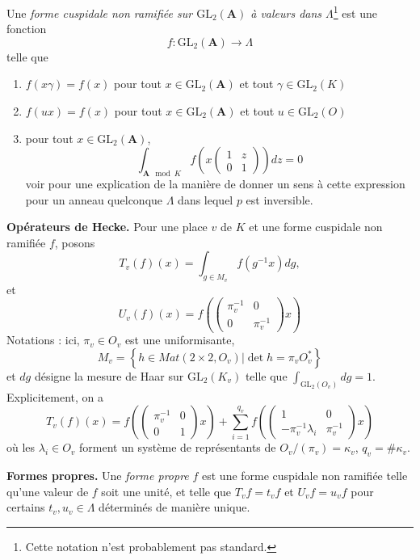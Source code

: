 \begin{definition}
\label{definition-unramified}
Une {\it forme cuspidale non ramifiée sur $\text{GL}_2(\mathbf{A})$ à valeurs dans
$\Lambda$}\footnote{Cette notation n'est probablement pas standard.}
est une fonction
$$
f : \text{GL}_2(\mathbf{A}) \to \Lambda
$$
telle que
\begin{enumerate}
\item $f(x\gamma) = f(x)$ pour tout $x\in \text{GL}_2(\mathbf{A})$ et tout
$\gamma\in \text{GL}_2(K)$
\item $f(ux) = f(x)$ pour tout $x\in \text{GL}_2(\mathbf{A})$ et tout
$u\in \text{GL}_2(O)$
\item pour tout $x\in \text{GL}_2(\mathbf{A})$,
$$
\int_{\mathbf{A} \mod K} f
\left(x
\left(
\begin{matrix}
1 & z \\
0 & 1
\end{matrix}
\right)
\right) dz = 0
$$
voir \cite[section 4.1]{dJ-conjecture}
pour une explication de la manière de donner un sens à cette expression
pour un anneau quelconque $\Lambda$ dans lequel $p$ est inversible.
\end{enumerate}
\end{definition}

\noindent
{\bf Opérateurs de Hecke.}
Pour une place $v$ de $K$ et une forme cuspidale non ramifiée $f$, posons
$$
T_v(f)(x) =
\int_{g\in M_v}f(g^{-1}x)dg,
$$
et
$$
U_v(f)(x) =
f\left(
\left(
\begin{matrix}
\pi_v^{-1} & 0 \\
0 & \pi_v^{-1}
\end{matrix}
\right)x\right)
$$
Notations : ici, $\pi_v \in O_v$ est une uniformisante,
$$
M_v =
\left\{
h\in Mat(2\times 2, O_v) | \det h = \pi_vO_v^*\right\}
$$
et $dg$ désigne la mesure de Haar sur $\text{GL}_2(K_v)$ telle que
$\int_{\text{GL}_2(O_v)} dg = 1$. Explicitement, on a
$$
T_v(f)(x) =
f\left(
\left(
\begin{matrix}
\pi_v^{-1}& 0 \\
0 & 1
\end{matrix}
\right)
x\right) +
\sum_{i = 1}^{q_v}
f\left(\left(
\begin{matrix}
1 & 0 \\
-\pi_v^{-1}\lambda_i
& \pi_v^{-1}
\end{matrix}
\right) x\right)
$$
où les $\lambda_i\in O_v$ forment un système de représentants de
$O_v/(\pi_v)=\kappa_v$, $q_v = \#\kappa_v$.

\medskip\noindent
{\bf Formes propres.} Une {\it forme propre} $f$ est une forme cuspidale non ramifiée
telle qu'une valeur de $f$ soit une unité, et telle que $T_vf = t_vf$ et
$U_vf = u_vf$ pour certains $t_v, u_v \in \Lambda$ déterminés de manière unique.

